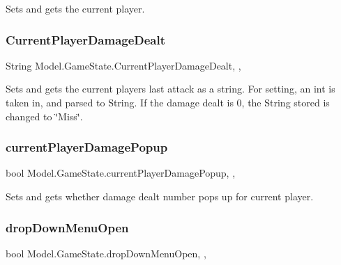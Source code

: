 Sets and gets the current player. \hypertarget{class_model_1_1_game_state_a829479b1c3cf8a4019a38c09990f2b7d}{}\label{class_model_1_1_game_state_a829479b1c3cf8a4019a38c09990f2b7d} 
\subsubsection{\texorpdfstring{Current\+Player\+Damage\+Dealt}{CurrentPlayerDamageDealt}}
{\footnotesize\ttfamily String Model.\+Game\+State.\+Current\+Player\+Damage\+Dealt\hspace{0.3cm}{\ttfamily [static]}, {\ttfamily [get]}, {\ttfamily [set]}}

Sets and gets the current player\textquotesingle{}s last attack as a string. For setting, an int is taken in, and parsed to String. If the damage dealt is 0, the String stored is changed to \char`\"{}\+Miss\char`\"{}. \hypertarget{class_model_1_1_game_state_a1c8543e79d3bb6fdfb705b0428d98bce}{}\label{class_model_1_1_game_state_a1c8543e79d3bb6fdfb705b0428d98bce} 
\subsubsection{\texorpdfstring{current\+Player\+Damage\+Popup}{currentPlayerDamagePopup}}
{\footnotesize\ttfamily bool Model.\+Game\+State.\+current\+Player\+Damage\+Popup\hspace{0.3cm}{\ttfamily [static]}, {\ttfamily [get]}, {\ttfamily [set]}}

Sets and gets whether damage dealt number pops up for current player. \hypertarget{class_model_1_1_game_state_a6e723d6c3b99e1c235c6d214ee17929a}{}\label{class_model_1_1_game_state_a6e723d6c3b99e1c235c6d214ee17929a} 
\subsubsection{\texorpdfstring{drop\+Down\+Menu\+Open}{dropDownMenuOpen}}
{\footnotesize\ttfamily bool Model.\+Game\+State.\+drop\+Down\+Menu\+Open\hspace{0.3cm}{\ttfamily [static]}, {\ttfamily [get]}, {\ttfamily [set]}}

